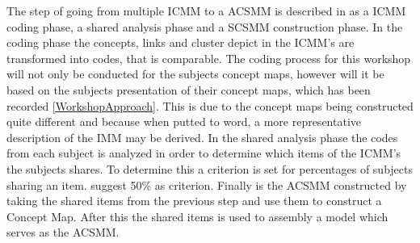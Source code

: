 The step of going from multiple ICMM to a ACSMM is described in \textcite{WEB:ConceptMapAnalysis} as a ICMM coding phase, a shared analysis phase and a SCSMM construction phase. In the coding phase the concepts, links and cluster depict in the ICMM's are transformed into codes, that is comparable. The coding process for this workshop will not only be conducted for the subjects concept maps, however will it be based on the subjects presentation of their concept maps, which has been recorded \autoref{WorkshopApproach}. This is due to the concept maps being constructed quite different and because when putted to word, a more representative description of the IMM may be derived. In the shared analysis phase the codes from each subject is analyzed in order to determine which items of the ICMM's the subjects shares. To determine this a criterion is set for percentages of subjects sharing an item. \textcite{WEB:ConceptMapAnalysis} suggest 50\% as criterion. Finally is the ACSMM constructed by taking the shared items from the previous step and use them to construct a Concept Map. After this the shared items is used to assembly a model which serves as the ACSMM. 










